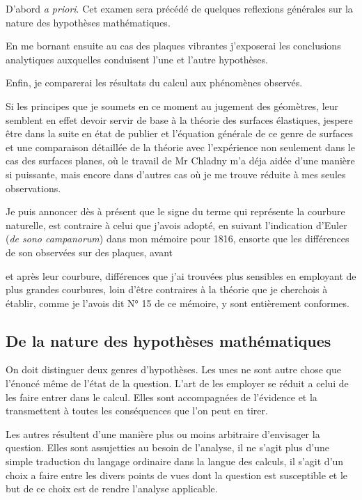 \documentclass[11pt,a4paper]{article}
\begin{document}
D'abord \emph{a priori}. Cet examen sera précédé de quelques reflexions
générales sur la nature des hypothèses mathématiques.

En me bornant ensuite au cas des plaques vibrantes j'exposerai les conclusions
analytiques auxquelles conduisent l'une et l'autre hypothèses.

Enfin, je comparerai les résultats du calcul aux phénomènes observés.

Si les principes que je soumets en ce moment au jugement des géomètres, leur
semblent en effet devoir servir de base à la théorie des surfaces élastiques,
jespere être dans la suite en état de publier et l'équation générale de ce
genre de surfaces et une comparaison détaillée de la théorie avec l'expérience
non seulement dans le cas des surfaces planes, où le travail de Mr Chladny m'a
déja aidée d'une manière si puissante, mais encore dans d'autres cas où je me
trouve réduite à mes seules observations.

Je puis annoncer dès à présent que le signe du terme qui représente la
courbure naturelle, est contraire à celui que j'avois adopté, en suivant
l'indication d'Euler (\emph{de sono campanorum}) dans mon mémoire pour 1816,
ensorte que les différences de son observées sur des plaques, avant

et après leur courbure, différences que j'ai trouvées plus sensibles en
employant de plus grandes courbures, loin d'être contraires à la théorie que
je cherchois à établir, comme je l'avois dit N° 15 de ce mémoire, y sont
entièrement conformes.

\subsection{De la nature des hypothèses mathématiques}

On doit distinguer deux genres d'hypothèses. Les unes ne sont autre chose que
l'énoncé même de l'état de la question. L'art de les employer se réduit a
celui de les faire entrer dans le calcul. Elles sont accompagnées de
l'évidence et la transmettent à toutes les conséquences que l'on peut en
tirer.

Les autres résultent d'une manière plus ou moins arbitraire d'envisager la
question. Elles sont assujetties au besoin de l'analyse, il ne s'agit plus
d'une simple traduction du langage ordinaire dans la langue des calculs, il
s'agit d'un choix a faire entre les divers points de vues dont la question est
susceptible et le but de ce choix est de rendre l'analyse applicable.
\end{document}
